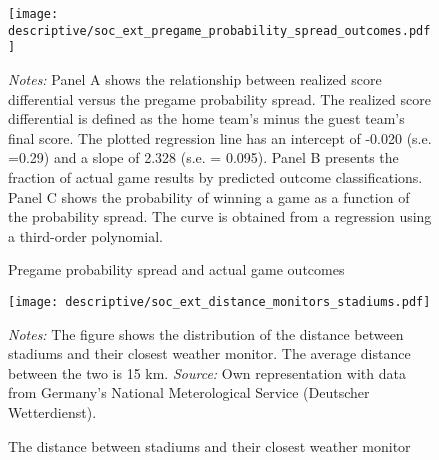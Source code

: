 \vspace*{\fill}\clearpage
\vspace*{\fill}
\begin{figure}[H]\centering
	\caption{Pregame probability spread and actual game outcomes}\label{fig_soc_ext:pregame_probability_spread_outcomes}
	\texttt{[image: descriptive/soc\_ext\_pregame\_probability\_spread\_outcomes.pdf]}
	\scriptsize
	\begin{minipage}{\linewidth}
		\emph{Notes:} Panel A shows the relationship between realized score differential versus the pregame probability spread. The realized score differential is defined as the home team's minus the guest team's final score. The plotted regression line has an intercept of -0.020 (s.e. =0.29) and a slope of 2.328 (s.e. = 0.095). Panel B presents the fraction of actual game results by predicted outcome classifications. Panel C shows the probability of winning a game as a function of the probability spread. The curve is obtained from a regression using a third-order polynomial.
	\end{minipage}
\end{figure}
\vspace*{\fill}\clearpage

\vspace*{\fill}
\begin{figure}[H]\centering
	\caption{The distance between stadiums and their closest weather monitor}\label{fig_soc_ext:hist_distance_stadium_monitors}
	\texttt{[image: descriptive/soc\_ext\_distance\_monitors\_stadiums.pdf]}
	\begin{minipage}{0.95\linewidth}
		\scriptsize{\emph{Notes:} The figure shows the distribution of the distance between stadiums and their closest weather monitor. The average distance between the two is 15 km. \newline \emph{Source:} Own representation with data from Germany's National Meterological Service (Deutscher Wetterdienst).}
	\end{minipage}
\end{figure}
\vspace*{\fill}\clearpage


